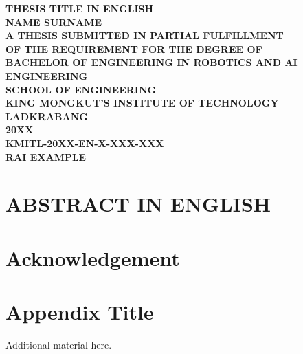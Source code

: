 \documentclass[12pt,a4paper]{report}
\begin{document}
\begin{titlepage}
    \centering
    \vspace*{1in}
    {\fontsize{18pt}{18pt}\bfseries THESIS TITLE IN ENGLISH \\[1.5em]}
    {\fontsize{16pt}{16pt}\bfseries NAME SURNAME \\[1.5em]}
    \vfill
    {\fontsize{16pt}{16pt}\bfseries
    A THESIS SUBMITTED IN PARTIAL FULFILLMENT \\ OF THE REQUIREMENT FOR THE DEGREE OF \\ BACHELOR OF ENGINEERING IN ROBOTICS AND AI ENGINEERING \\ SCHOOL OF ENGINEERING \\ KING MONGKUT'S INSTITUTE OF TECHNOLOGY LADKRABANG \\ 20XX \\ KMITL-20XX-EN-X-XXX-XXX \\ RAI EXAMPLE}
\end{titlepage}

\chapter*{ABSTRACT IN ENGLISH}


\chapter*{Acknowledgement}

\cleardoublepage

\tableofcontents
\listoftables
\listoffigures

\cleardoublepage
{}







\cite{zhang2023design}

\cleardoublepage
{}



\appendix
\chapter{Appendix Title}
Additional material here.
\end{document}
